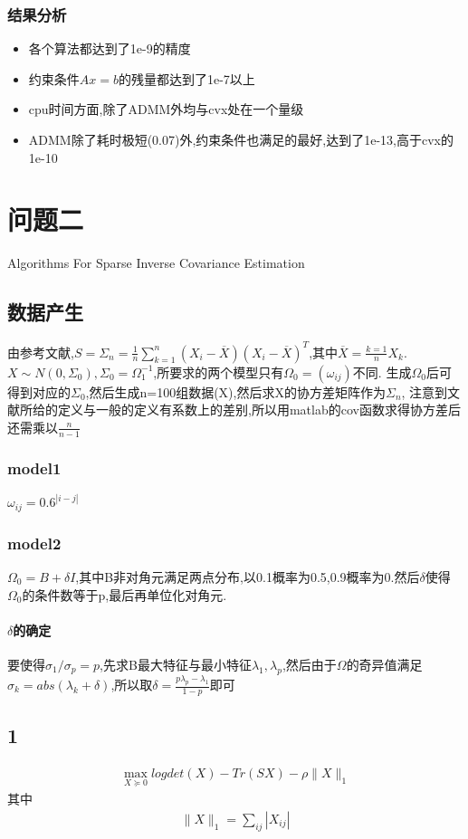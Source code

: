 \documentclass[UTF8]{ctexart}
\begin{document}
\subsubsection{结果分析}
\begin{itemize}
  \item 各个算法都达到了1e-9的精度
  \item 约束条件$Ax=b$的残量都达到了1e-7以上
  \item cpu时间方面,除了ADMM外均与cvx处在一个量级
  \item ADMM除了耗时极短(0.07)外,约束条件也满足的最好,达到了1e-13,高于cvx的1e-10
\end{itemize}
  \section{问题二}

  Algorithms For Sparse Inverse Covariance Estimation
    \subsection{数据产生}
  由参考文献,$S=\Sigma_n=\frac{1}{n}\sum_{k=1}^{n}(X_i-\overline{X})(X_i-\overline{X})^T$,其中$\overline{X}=\frac{k=1}{n}X_k$.
  $X\sim N(0,\Sigma_0),\Sigma_0=\Omega_1^{-1}$,所要求的两个模型只有$\Omega_0=(\omega_{ij})$不同.
  生成$\Omega_0$后可得到对应的$\Sigma_0$,然后生成n=100组数据(X),然后求X的协方差矩阵作为$\Sigma_n$,
  注意到文献所给的定义与一般的定义有系数上的差别,所以用matlab的cov函数求得协方差后还需乘以$\frac{n}{n-1}$
  \subsubsection{model1}
  $\omega_{ij}=0.6^{|i-j|}$
  \subsubsection{model2}
  $\Omega_0=B+\delta I$,其中B非对角元满足两点分布,以0.1概率为0.5,0.9概率为0.然后$\delta$使得$\Omega_0$的条件数等于p,最后再单位化对角元.
  \paragraph{$\delta$的确定}
  要使得$\sigma_1/\sigma_p=p$,先求B最大特征与最小特征$\lambda_1,\lambda_p$,然后由于$\Omega$的奇异值满足$\sigma_k=abs(\lambda_k+\delta)$,所以取$\delta=\frac{p\lambda_p-\lambda_1}{1-p}$即可

  \subsection{1}
    \begin{equation}
    \begin{split}
    \max_{X\succeq0} logdet(X)-Tr(SX)-\rho \|X\|_1
    \end{split}
  \end{equation}
  其中
      \begin{equation}
    \begin{split}
\|X\|_1=\sum_{ij}|X_{ij}|
    \end{split}
  \end{equation}
\end{document}
